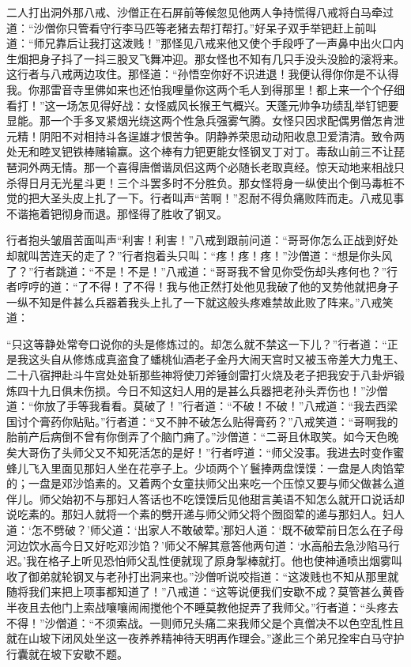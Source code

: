 \documentclass[12pt,UTF8]{ctexbook}
\begin{document}
二人打出洞外那八戒、沙僧正在石屏前等候忽见他两人争持慌得八戒将白马牵过道：“沙僧你只管看守行李马匹等老猪去帮打帮打。”好呆子双手举钯赶上前叫道：“师兄靠后让我打这泼贱！”那怪见八戒来他又使个手段呼了一声鼻中出火口内生烟把身子抖了一抖三股叉飞舞冲迎。那女怪也不知有几只手没头没脸的滚将来。这行者与八戒两边攻住。那怪道：“孙悟空你好不识进退！我便认得你你是不认得我。你那雷音寺里佛如来也还怕我哩量你这两个毛人到得那里！都上来一个个仔细看打！”这一场怎见得好战：女怪威风长猴王气概兴。天蓬元帅争功绩乱举钉钯要显能。那一个手多叉紧烟光绕这两个性急兵强雾气腾。女怪只因求配偶男僧怎肯泄元精！阴阳不对相持斗各逞雄才恨苦争。阴静养荣思动动阳收息卫爱清清。致令两处无和睦叉钯铁棒赌输赢。这个棒有力钯更能女怪钢叉丁对丁。毒敌山前三不让琵琶洞外两无情。那一个喜得唐僧谐凤侣这两个必随长老取真经。惊天动地来相战只杀得日月无光星斗更！三个斗罢多时不分胜负。那女怪将身一纵使出个倒马毒桩不觉的把大圣头皮上扎了一下。行者叫声“苦啊！”忍耐不得负痛败阵而走。八戒见事不谐拖着钯彻身而退。那怪得了胜收了钢叉。

行者抱头皱眉苦面叫声“利害！利害！”八戒到跟前问道：“哥哥你怎么正战到好处却就叫苦连天的走了？”行者抱着头只叫：“疼！疼！疼！”沙僧道：“想是你头风了？”行者跳道：“不是！不是！”八戒道：“哥哥我不曾见你受伤却头疼何也？”行者哼哼的道：“了不得！了不得！我与他正然打处他见我破了他的叉势他就把身子一纵不知是件甚么兵器着我头上扎了一下就这般头疼难禁故此败了阵来。”八戒笑道：

“只这等静处常夸口说你的头是修炼过的。却怎么就不禁这一下儿？”行者道：“正是我这头自从修炼成真盗食了蟠桃仙酒老子金丹大闹天宫时又被玉帝差大力鬼王、二十八宿押赴斗牛宫处处斩那些神将使刀斧锤剑雷打火烧及老子把我安于八卦炉锻炼四十九日俱未伤损。今日不知这妇人用的是甚么兵器把老孙头弄伤也！”沙僧道：“你放了手等我看看。莫破了！”行者道：“不破！不破！”八戒道：“我去西梁国讨个膏药你贴贴。”行者道：“又不肿不破怎么贴得膏药？”八戒笑道：“哥啊我的胎前产后病倒不曾有你倒弄了个脑门痈了。”沙僧道：“二哥且休取笑。如今天色晚矣大哥伤了头师父又不知死活怎的是好！”行者哼道：“师父没事。我进去时变作蜜蜂儿飞入里面见那妇人坐在花亭子上。少顷两个丫鬟捧两盘馍馍：一盘是人肉馅荤的；一盘是邓沙馅素的。又着两个女童扶师父出来吃一个压惊又要与师父做甚么道伴儿。师父始初不与那妇人答话也不吃馍馍后见他甜言美语不知怎么就开口说话却说吃素的。那妇人就将一个素的劈开递与师父师父将个囫囵荤的递与那妇人。妇人道：‘怎不劈破？’师父道：‘出家人不敢破荤。’那妇人道：‘既不破荤前日怎么在子母河边饮水高今日又好吃邓沙馅？’师父不解其意答他两句道：‘水高船去急沙陷马行迟。’我在格子上听见恐怕师父乱性便就现了原身掣棒就打。他也使神通喷出烟雾叫收了御弟就轮钢叉与老孙打出洞来也。”沙僧听说咬指道：“这泼贱也不知从那里就随将我们来把上项事都知道了！”八戒道：“这等说便我们安歇不成？莫管甚么黄昏半夜且去他门上索战嚷嚷闹闹搅他个不睡莫教他捉弄了我师父。”行者道：“头疼去不得！”沙僧道：“不须索战。一则师兄头痛二来我师父是个真僧决不以色空乱性且就在山坡下闭风处坐这一夜养养精神待天明再作理会。”遂此三个弟兄拴牢白马守护行囊就在坡下安歇不题。
\end{document}
